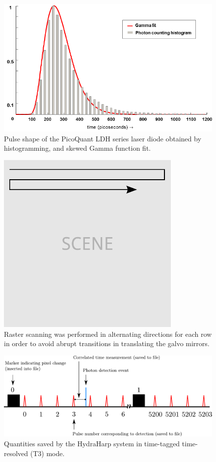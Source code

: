\begin{figure}[htb]
\centerline{\includegraphics[width=14cm]{figure-first-pulse.pdf}}
\caption{Pulse shape of the PicoQuant LDH series laser diode obtained by histogramming, and skewed Gamma function fit.}
\label{figure:first-pulse}
\end{figure}

\begin{figure}[htb]
\centerline{\includegraphics[width=9cm]{figure-first-scanning.pdf}}
\caption{Raster scanning was performed in alternating directions for each row in order to avoid abrupt transitions in translating the galvo mirrors.}
\label{figure:first-scanning}
\end{figure}

\begin{figure}[htb]
\centerline{\includegraphics[width=15cm]{figure-first-procedure.pdf}}
\caption{Quantities saved by the HydraHarp system in time-tagged time-resolved (T3) mode.}
\label{figure:first-procedure}
\end{figure}

